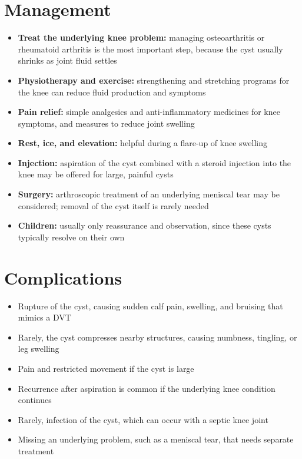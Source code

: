 \section*{Management}
\begin{itemize}
    \item \textbf{Treat the underlying knee problem:} managing osteoarthritis or rheumatoid arthritis is the most important step, because the cyst usually shrinks as joint fluid settles
    \item \textbf{Physiotherapy and exercise:} strengthening and stretching programs for the knee can reduce fluid production and symptoms
    \item \textbf{Pain relief:} simple analgesics and anti-inflammatory medicines for knee symptoms, and measures to reduce joint swelling
    \item \textbf{Rest, ice, and elevation:} helpful during a flare-up of knee swelling
    \item \textbf{Injection:} aspiration of the cyst combined with a steroid injection into the knee may be offered for large, painful cysts
    \item \textbf{Surgery:} arthroscopic treatment of an underlying meniscal tear may be considered; removal of the cyst itself is rarely needed
    \item \textbf{Children:} usually only reassurance and observation, since these cysts typically resolve on their own
\end{itemize}

\section*{Complications}
\begin{itemize}
    \item Rupture of the cyst, causing sudden calf pain, swelling, and bruising that mimics a DVT
    \item Rarely, the cyst compresses nearby structures, causing numbness, tingling, or leg swelling
    \item Pain and restricted movement if the cyst is large
    \item Recurrence after aspiration is common if the underlying knee condition continues
    \item Rarely, infection of the cyst, which can occur with a septic knee joint
    \item Missing an underlying problem, such as a meniscal tear, that needs separate treatment
\end{itemize}

